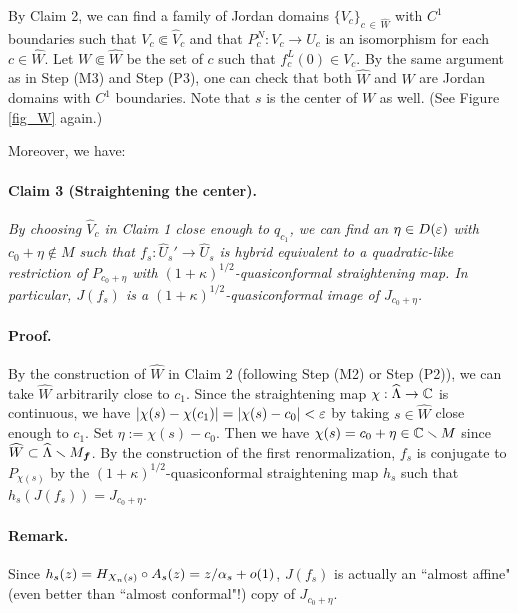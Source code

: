 By Claim 2, we can find 
a family of Jordan domains $\{V_c\}_{c \, \in \, \widehat{W}}$
with $C^1$ boundaries 
such that $V_c \Subset \widehat{V}_c$
and that $P_c^N:V_c \to U_c$ is an isomorphism for each $c \in \widehat{W}$.
Let $W \Subset \widehat{W}$ be the set of 
$c$ such that $f_c^L(0) \in V_c$.
By the same argument as in Step (M3) and Step (P3),
one can check that both $\widehat{W}$ and $W$ are 
Jordan domains with $C^1$ boundaries.
Note that $s$ is the center of $W$ as well.
(See Figure \ref{fig_W} again.)





Moreover, we have:

\paragraph{\bf Claim 3 (Straightening the center).}
{\it
By choosing $\widehat{V}_c$ in Claim 1 
close enough to $q_{c_1}$,
we can find an $\eta \in D(\varepsilon)$ 
with $c_0 +\eta \notin M$
such that $f_s:\widehat{U}_s' \to \widehat{U}_s$ is 
hybrid equivalent to 
a quadratic-like restriction of $P_{c_0+\eta}$ 
 with $(1+\kappa)^{1/2}$-quasiconformal straightening map.
In particular, $J(f_s)$ is a $(1+\kappa)^{1/2}$-quasiconformal
image of $J_{c_0+\eta}$.
}

\paragraph{\bf Proof.}
By the construction of $\widehat{W}$ in Claim 2
(following Step (M2) or Step (P2)),
we can take $\widehat{W}$ arbitrarily close to $c_1$.
Since the straightening map
$\chi:\widehat{\Lambda} \to \mathbb C$
is continuous, 
we have $|\chi(s)-\chi(c_1)| = |\chi(s)-c_0|<\varepsilon$
by taking $s \in \widehat{W}$ close enough to $c_1$.
Set $\eta:=\chi(s)-c_0$.
Then we have
$\chi(s)=c_0+\eta \in \mathbb C  \smallsetminus M$ 
since $\widehat{W} \subset \widehat{\Lambda} \smallsetminus M_{\boldsymbol{f}}$.
By the construction of the first renormalization,
$f_s$ is conjugate to $P_{\chi(s)}$ 
by the $(1+\kappa)^{1/2}$-quasiconformal straightening map $h_s$
such that $h_s(J(f_s))=J_{c_0+\eta}$.
\QED

\medskip

\paragraph{\bf Remark.}
Since $h_s(z)= H_{X_n(s)} \circ A_s(z)=z/\alpha_s + o(1)$,
 $J(f_s)$ is actually an ``almost affine" (even better than ``almost conformal"!)
 copy of $J_{c_0+\eta}$.



